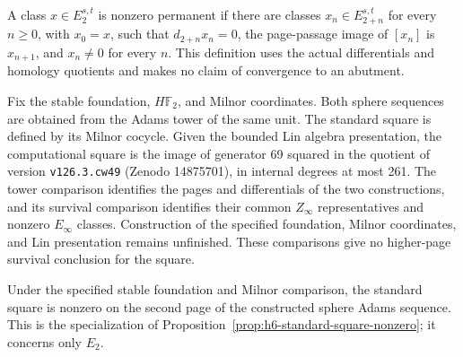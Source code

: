 \begin{definition}
  \label{def:h6-pagewise-permanence}
  \notready
  A class $x\in E_2^{s,t}$ is nonzero permanent if there are classes
  $x_n\in E_{2+n}^{s,t}$ for every $n\ge0$, with $x_0=x$, such that
  $d_{2+n}x_n=0$, the page-passage image of $[x_n]$ is $x_{n+1}$, and
  $x_n\ne0$ for every $n$.  This definition uses the actual differentials
  and homology quotients and makes no claim of convergence to an abutment.
\end{definition}



\begin{definition}
  \label{def:h6-fixed-computation}
  \notready
  Fix the stable foundation, $H\mathbb F_2$, and Milnor coordinates.
  Both sphere sequences are obtained from the Adams tower of the same unit.
  The standard square is defined by its Milnor cocycle. Given the bounded
  Lin algebra presentation, the computational square is the image of
  generator 69 squared in the quotient of version \texttt{v126.3.cw49}
  (Zenodo 14875701), in internal degrees at most 261.
  The tower comparison identifies the pages and differentials of the two
  constructions, and its survival comparison identifies their common
  $Z_\infty$ representatives and nonzero $E_\infty$ classes.
  Construction of the specified foundation, Milnor coordinates, and Lin
  presentation remains unfinished. These comparisons give no higher-page
  survival conclusion for the square.
\end{definition}

\begin{proposition}
  \label{prop:h6-fixed-standard-square-nonzero}
  \notready
  Under the specified stable foundation and Milnor comparison, the
  standard square is nonzero on the second page of the constructed sphere
  Adams sequence. This is the specialization of
  Proposition~\ref{prop:h6-standard-square-nonzero}; it concerns only $E_2$.
\end{proposition}

